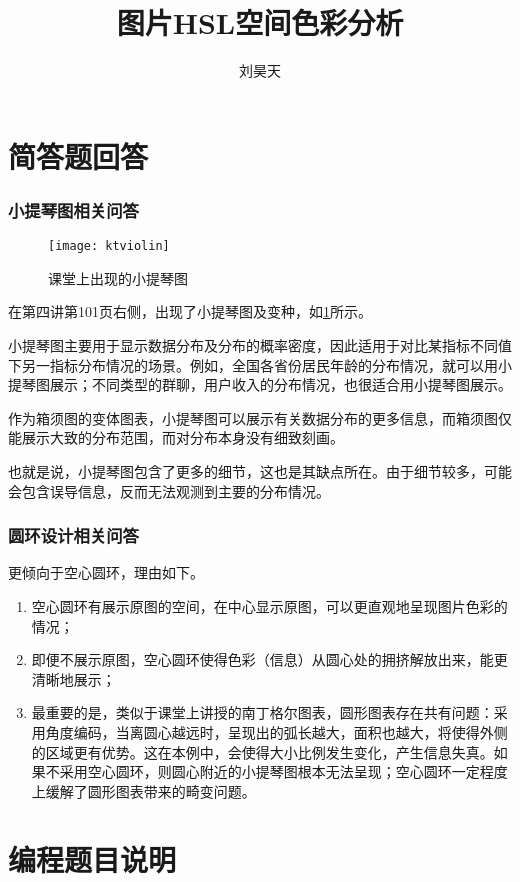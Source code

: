 \documentclass[a4paper,12pt]{article}
\title{图片HSL空间色彩分析}
\author{刘昊天}
\begin{document}
    \maketitle
    \part{简答题回答}
    \section{小提琴图相关问答}
    \begin{figure}
      \centering
      \texttt{[image: ktviolin]}
      \caption{课堂上出现的小提琴图}
      \label{fig:ktviolin}
    \end{figure}
    在第四讲第101页右侧，出现了小提琴图及变种，如\cref{fig:ktviolin}所示。

    小提琴图主要用于显示数据分布及分布的概率密度，因此适用于对比某指标不同值下另一指标分布情况的场景。例如，全国各省份居民年龄的分布情况，就可以用小提琴图展示；不同类型的群聊，用户收入的分布情况，也很适合用小提琴图展示。

    作为箱须图的变体图表，小提琴图可以展示有关数据分布的更多信息，而箱须图仅能展示大致的分布范围，而对分布本身没有细致刻画。

    也就是说，小提琴图包含了更多的细节，这也是其缺点所在。由于细节较多，可能会包含误导信息，反而无法观测到主要的分布情况。
    \section{圆环设计相关问答}
    更倾向于空心圆环，理由如下。
    \begin{enumerate}
      \item 空心圆环有展示原图的空间，在中心显示原图，可以更直观地呈现图片色彩的情况；
      \item 即便不展示原图，空心圆环使得色彩（信息）从圆心处的拥挤解放出来，能更清晰地展示；
      \item 最重要的是，类似于课堂上讲授的南丁格尔图表，圆形图表存在共有问题：采用角度编码，当离圆心越远时，呈现出的弧长越大，面积也越大，将使得外侧的区域更有优势。这在本例中，会使得大小比例发生变化，产生信息失真。如果不采用空心圆环，则圆心附近的小提琴图根本无法呈现；空心圆环一定程度上缓解了圆形图表带来的畸变问题。
    \end{enumerate}
    \part{编程题目说明}
\end{document}
